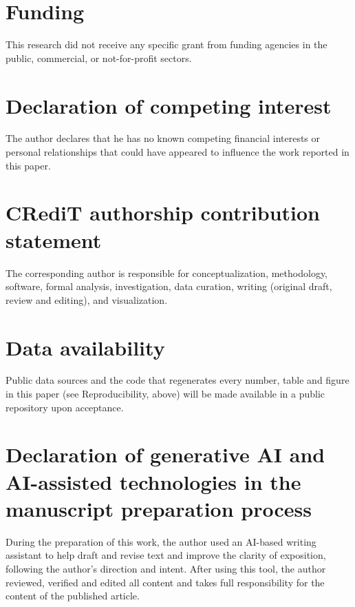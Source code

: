 \documentclass[authoryear,preprint,12pt]{elsarticle}
\theoremstyle{plain}
\theoremstyle{remark}
\begin{document}
\section*{Funding}
This research did not receive any specific grant from funding agencies in the
public, commercial, or not-for-profit sectors.

\section*{Declaration of competing interest}
The author declares that he has no known competing financial interests or
personal relationships that could have appeared to influence the work reported
in this paper.

\section*{CRediT authorship contribution statement}
The corresponding author is responsible for conceptualization, methodology,
software, formal analysis, investigation, data curation, writing (original
draft, review and editing), and visualization.

\section*{Data availability}
Public data sources and the code that regenerates every number, table and
figure in this paper (see Reproducibility, above) will be made available in a
public repository upon acceptance.

\section*{Declaration of generative AI and AI-assisted technologies in the manuscript preparation process}
During the preparation of this work, the author used an AI-based writing
assistant to help draft and revise text and improve the clarity of exposition,
following the author's direction and intent. After using this tool, the
author reviewed, verified and edited all content and takes full
responsibility for the content of the published article.

\small


\end{document}
